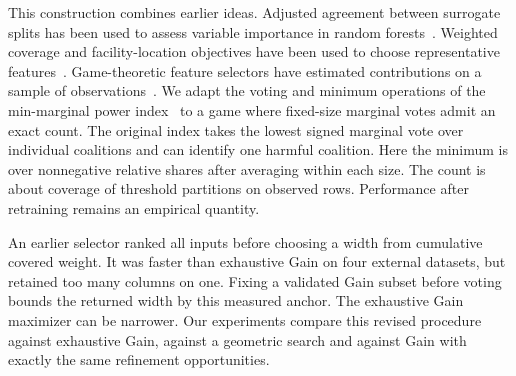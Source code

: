 \documentclass{article}
\begin{document}
This construction combines earlier ideas. Adjusted agreement between surrogate splits has been used to assess variable importance in random forests~\citep{seifert2019surrogate}. Weighted coverage and facility-location objectives have been used to choose representative features~\citep{liu2013coverage}. Game-theoretic feature selectors have estimated contributions on a sample of observations~\citep{zhaoStrategicInputs}. We adapt the voting and minimum operations of the min-marginal power index~\citep{shi2026minpi} to a game where fixed-size marginal votes admit an exact count. The original index takes the lowest signed marginal vote over individual coalitions and can identify one harmful coalition. Here the minimum is over nonnegative relative shares after averaging within each size. The count is about coverage of threshold partitions on observed rows. Performance after retraining remains an empirical quantity.

An earlier selector ranked all inputs before choosing a width from cumulative covered weight. It was faster than exhaustive Gain on four external datasets, but retained too many columns on one. Fixing a validated Gain subset before voting bounds the returned width by this measured anchor. The exhaustive Gain maximizer can be narrower. Our experiments compare this revised procedure against exhaustive Gain, against a geometric search and against Gain with exactly the same refinement opportunities.






\end{document}
